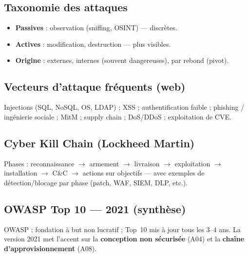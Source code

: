 \documentclass[11pt,a4paper]{article}
\begin{document}
\subsection{Taxonomie des attaques}
\begin{itemize}[nosep]
  \item \textbf{Passives} : observation (sniffing, OSINT) — discrètes.
  \item \textbf{Actives} : modification, destruction — plus visibles.
  \item \textbf{Origine} : externes, internes (souvent dangereuses), par rebond (pivot).
\end{itemize}

\subsection{Vecteurs d'attaque fréquents (web)}
Injections (SQL, NoSQL, OS, LDAP) ; XSS ; authentification faible ; phishing / ingénierie sociale ; MitM ; supply chain ; DoS/DDoS ; exploitation de CVE.

\subsection{Cyber Kill Chain (Lockheed Martin)}
Phases : reconnaissance $\rightarrow$ armement $\rightarrow$ livraison $\rightarrow$ exploitation $\rightarrow$ installation $\rightarrow$ C\&C $\rightarrow$ actions sur objectifs — avec exemples de détection/blocage par phase (patch, WAF, SIEM, DLP, etc.).

\subsection{OWASP Top 10 — 2021 (synthèse)}
OWASP : fondation à but non lucratif ; Top~10 mis à jour tous les 3--4 ans. La version 2021 met l'accent sur la \textbf{conception non sécurisée} (A04) et la \textbf{chaîne d'approvisionnement} (A08).
\end{document}
